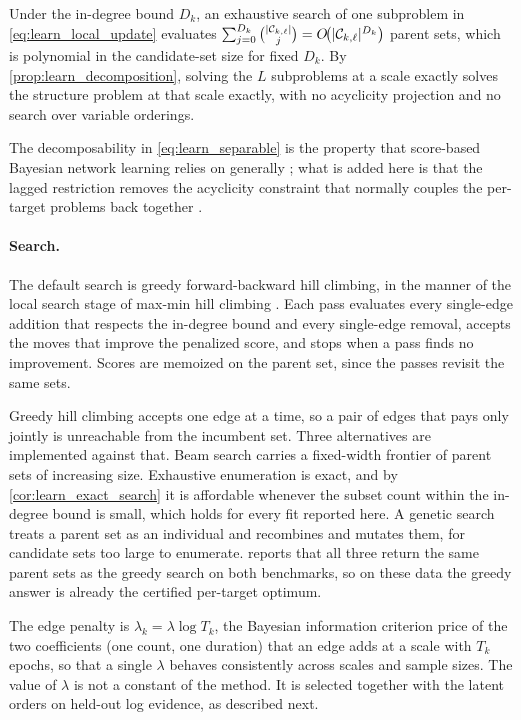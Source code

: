 \begin{corollary}
\label{cor:learn_exact_search}
Under the in-degree bound $D_k$, an exhaustive search of one subproblem in
\cref{eq:learn_local_update} evaluates
$\sum_{j=0}^{D_k} \binom{|{\mathcal{C}}_{k,\ell}|}{j} = O\!\big(|{\mathcal{C}}_{k,\ell}|^{D_k}\big)$ parent sets, which
is polynomial in the candidate-set size for fixed $D_k$. By \cref{prop:learn_decomposition},
solving the $L$ subproblems at a scale exactly solves the structure problem at that scale exactly,
with no acyclicity projection and no search over variable orderings.
\end{corollary}

The decomposability in \cref{eq:learn_separable} is the property that score-based Bayesian network
learning relies on generally \citep{heckerman1995learning,chickering2002optimal}; what is added
here is that the lagged restriction removes the acyclicity constraint that normally couples the
per-target problems back together \citep{murphy2002dbn,pamfil2020dynotears}.

\paragraph{Search.}
The default search is greedy forward-backward hill climbing, in the manner of the local search
stage of max-min hill climbing \citep{tsamardinos2006max}. Each pass evaluates every single-edge
addition that respects the in-degree bound and every single-edge removal, accepts the moves that
improve the penalized score, and stops when a pass finds no improvement. Scores are memoized on
the parent set, since the passes revisit the same sets.

Greedy hill climbing accepts one edge at a time, so a pair of edges that pays only jointly is
unreachable from the incumbent set. Three alternatives are implemented against that. Beam search
carries a fixed-width frontier of parent sets of increasing size. Exhaustive enumeration is exact,
and by \cref{cor:learn_exact_search} it is affordable whenever the subset count within the
in-degree bound is small, which holds for every fit reported here. A genetic search treats a
parent set as an individual and recombines and mutates them, for candidate sets too large to
enumerate.  reports that all three return the same parent sets as the
greedy search on both benchmarks, so on these data the greedy answer is already the certified
per-target optimum.

The edge penalty is $\lambda_k = \lambda \log T_k$, the Bayesian information criterion price of
the two coefficients (one count, one duration) that an edge adds at a scale with $T_k$ epochs, so
that a single $\lambda$ behaves consistently across scales and sample sizes. The value of
$\lambda$ is not a constant of the method. It is selected together with the latent orders on
held-out log evidence, as described next.

